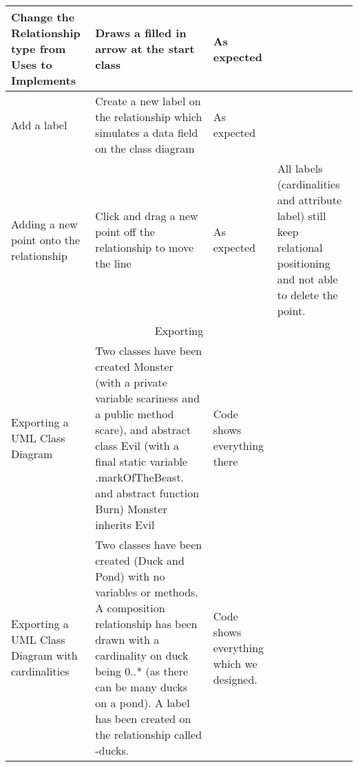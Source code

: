 \begin{landscape}
\begin{tabular}{| p{3cm} | p{7cm} | p{7cm} | p{8cm} |}
	Change the Relationship type from Uses to Implements  & Draws a filled in arrow at the start class & As expected & \\ \hline

	Add a label & Create a new label on the relationship which simulates a data field on the class diagram & As expected & \\ \hline

	Adding a new point onto the relationship & Click and drag a new point off the relationship to move the line & As expected & All labels (cardinalities and attribute label) still keep relational positioning and not able to delete the point. \\ \hline

	\multicolumn{4}{|c|}{Exporting} \\ \hline
	Exporting a UML Class Diagram & Two classes have been created Monster (with a private variable scariness and a public method scare), and abstract class Evil (with a final static variable .markOfTheBeast. and abstract function Burn) Monster inherits Evil & Code shows everything there & \\ \hline

	Exporting a UML Class Diagram with cardinalities & Two classes have been created (Duck and Pond) with no variables or methods. A composition relationship has been drawn with a cardinality on duck being 0..* (as there can be many ducks on a pond). A label has been created on the relationship called -ducks. & Code shows everything which we designed. & \\ \hline

\end{tabular}

 \end{landscape}
\newpage




